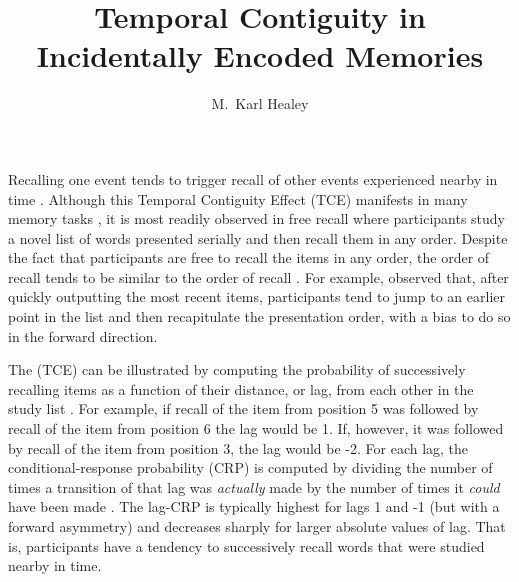 \documentclass[man,natbib,floatsintext]{apa6} %
\title{Temporal Contiguity in Incidentally Encoded Memories}
\author{M.\ Karl Healey}
\affiliation{Michigan State University}
\begin{document}
\maketitle
\label{TODO-1}

\color{red}
Recalling one event tends to trigger recall of other events experienced nearby in time \citep[for a review see][]{HealKaha17}. Although this Temporal Contiguity Effect (TCE) manifests in many memory tasks \citep{DaviEtal08,SchwEtal05}, it is most readily observed in free recall where participants study a novel list of words presented serially and then recall them in any order. Despite the fact that participants are free to recall the items in any order, the order of recall tends to be similar to the order of recall \citep[for early reviews, see][]{Post71,Post72}. For example, \citet[][p. 202]{Murd74} observed that, after quickly outputting the most recent items, participants tend to jump to an earlier point in the list and then recapitulate the presentation order, with a bias to do so in the forward direction.

The (TCE) can be illustrated by computing the probability of successively recalling items as a function of their distance, or lag, from each other in the study list \citep{Kaha96}. For example, if recall of the item from position 5 was followed by recall of the item from position 6 the lag would be 1. If, however, it was followed by recall of the item from position 3, the lag would be -2. For each lag, the conditional-response probability (CRP) is computed by dividing the number of times a transition of that lag was \emph{actually} made by the number of times it \emph{could} have been made \citep[e.g., it could not have been made if the item $i+lag$ was already recalled;][]{Kaha96}. The lag-CRP is typically highest for lags 1 and -1 (but with a forward asymmetry) and decreases sharply for larger absolute values of lag. That is, participants have a tendency to successively recall words that were studied nearby in time.
\end{document}
